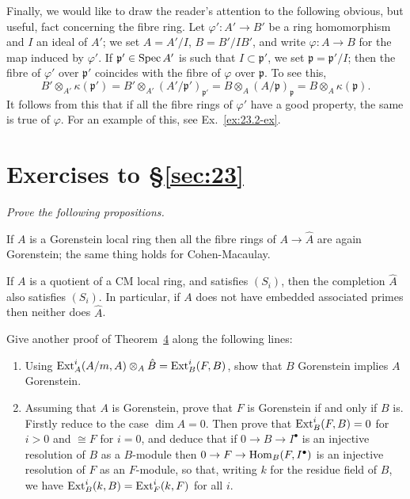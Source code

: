 Finally, we would like to draw the reader's attention to the following obvious,
but useful, fact concerning the fibre ring. Let $\varphi'\colon A' \to B'$ be a ring
homomorphism and $I$ an ideal of $A'$; we set $A = A'/I$, $B = B'/IB'$, and write
$\varphi\colon A \to B$ for the map induced by $\varphi'$. If $\mathfrak{p}' \in \operatorname{Spec} A'$ is such that
$I \subset \mathfrak{p}'$, we set $\mathfrak{p} = \mathfrak{p}'/I$; then the fibre of $\varphi'$ over $\mathfrak{p}'$ coincides
with the fibre of $\varphi$ over $\mathfrak{p}$. To see this,
\[
  B' \otimes_{A'} \kappa(\mathfrak{p}') = B' \otimes_{A'} (A'/\mathfrak{p}')_{\mathfrak{p}'} = B \otimes_A (A/\mathfrak{p})_{\mathfrak{p}} = B \otimes_A \kappa(\mathfrak{p}).
\]
It follows from this that if all the fibre rings of $\varphi'$ have a good property,
the same is true of $\varphi$. For an example of this, see Ex.~\ref{ex:23.2-ex}.

\section*{Exercises to \S\ref{sec:23}}
\emph{Prove the following propositions.}

\begin{exercise}\label{ex:23.1-ex}
If $A$ is a Gorenstein local ring then all the fibre rings of $A \to \hat{A}$ are again
Gorenstein; the same thing holds for Cohen-Macaulay.
\end{exercise}

\begin{exercise}\label{ex:23.2-ex}
If $A$ is a quotient of a CM local ring, and satisfies $(S_i)$, then the completion
$\hat{A}$ also satisfies $(S_i)$. In particular, if $A$ does not have embedded
associated primes then neither does $\hat{A}$.
\end{exercise}

\begin{exercise}\label{ex:23.3-ex}
Give another proof of Theorem~\hyperref[thm:23.4]{4} along the following lines:
\begin{enumerate}[(1)]
  \item Using $\operatorname{Ext}^i_A(A/m, A) \otimes_A \hat{B} = \operatorname{Ext}^i_B(F, B)$, show that $B$ Gorenstein
        implies $A$ Gorenstein.
  \item Assuming that $A$ is Gorenstein, prove that $F$ is Gorenstein if and only
        if $B$ is. Firstly reduce to the case $\dim A = 0$. Then prove that
        $\operatorname{Ext}^i_B(F, B) = 0$ for $i > 0$ and $\cong F$ for $i = 0$, and deduce that if
        $0 \to B \to I^{\bullet}$ is an injective resolution of $B$ as a $B$-module then
        $0 \to F \to \operatorname{Hom}_B(F, I^{\bullet})$ is an injective resolution of $F$ as an $F$-module,
        so that, writing $k$ for the residue field of $B$, we have
        $\operatorname{Ext}^i_B(k, B) = \operatorname{Ext}^i_F(k, F)$ for all $i$.
\end{enumerate}
\end{exercise}
